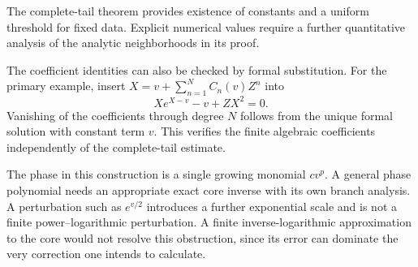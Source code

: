The complete-tail theorem provides existence of constants and a uniform
threshold for fixed data. Explicit numerical values require a further
quantitative analysis of the analytic neighborhoods in its proof.

The coefficient identities can also be checked by formal substitution.
For the primary example, insert
$X=v+\sum_{n=1}^N C_n(v)Z^n$ into
\[
 X e^{X-v}-v+ZX^2=0.
\]
Vanishing of the coefficients through degree $N$ follows from the unique
formal solution with constant term $v$. This verifies the finite algebraic
coefficients independently of the complete-tail estimate.

The phase in this construction is a single growing monomial $cv^p$.
A general phase polynomial needs an appropriate exact core inverse with
its own branch analysis. A perturbation such as $e^{v/2}$ introduces a
further exponential scale and is not a finite power--logarithmic
perturbation. A finite inverse-logarithmic approximation to the core would
not resolve this obstruction, since its error can dominate the very
correction one intends to calculate.
